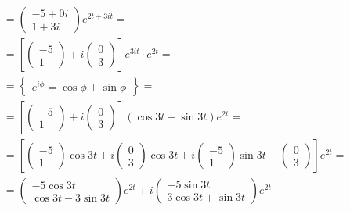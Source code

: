 \documentclass[10pt, a4paper]{article}
\begin{document}
\begin{enumerate}
\begin{enumerate}
\begin{align*}
                    & = \begin{pmatrix} -5 + 0i \\ 1  + 3i \end{pmatrix} e^{2t + 3it} = \\
                    & = [\begin{pmatrix} -5 \\ 1 \end{pmatrix}
                        + i\begin{pmatrix} 0 \\ 3\end{pmatrix}] e^{3it} \cdot e^{2t} = \\
                    & = \begin{Bmatrix} e^{i \phi} = \cos{\phi} + \sin{\phi} \end{Bmatrix} = \\
                    & = [\begin{pmatrix} -5 \\ 1 \end{pmatrix}
                        + i\begin{pmatrix} 0 \\ 3\end{pmatrix}](\cos{3t} + \sin{3t})e^{2t} = \\
                    & = [\begin{pmatrix} -5 \\ 1 \end{pmatrix}\cos{3t}
                        + i\begin{pmatrix} 0 \\ 3 \end{pmatrix}\cos{3t}
                        + i\begin{pmatrix} -5 \\ 1 \end{pmatrix}\sin{3t}
                        - \begin{pmatrix} 0 \\ 3\end{pmatrix}]e^{2t} = \\
                    & = \begin{pmatrix} -5\cos{3t} \\ \cos{3t} - 3\sin{3t} \end{pmatrix} e^{2t}
                        + i\begin{pmatrix} -5\sin{3t} \\ 3\cos{3t} + \sin{3t} \end{pmatrix} e^{2t}
                \end{align*}

\end{enumerate}
\end{enumerate}
\end{document}
